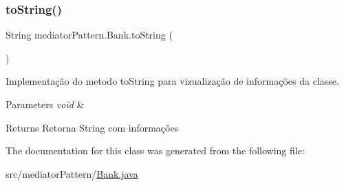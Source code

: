 \subsubsection{\texorpdfstring{toString()}{toString()}}
{\footnotesize\ttfamily String mediator\+Pattern.\+Bank.\+to\+String (\begin{DoxyParamCaption}{ }\end{DoxyParamCaption})}



Implementação do metodo to\+String para vizualização de informações da classe. 


\begin{DoxyParams}{Parameters}
{\em void} & \\
\hline
\end{DoxyParams}
\begin{DoxyReturn}{Returns}
Retorna String com informações 
\end{DoxyReturn}


The documentation for this class was generated from the following file\+:\begin{DoxyCompactItemize}
\item 
src/mediator\+Pattern/\mbox{\hyperlink{_bank_8java}{Bank.\+java}}\end{DoxyCompactItemize}
